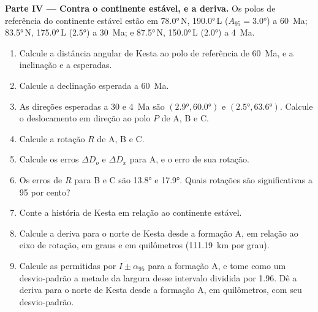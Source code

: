 \begin{problem}
\medskip\noindent\textbf{Parte IV --- Contra o continente estável, e a deriva.} Os
polos de referência do continente estável estão em \ang{78.0}\,N, \ang{190.0}\,L
($A_{95} = \ang{3.0}$) a \qty{60}{Ma}; \ang{83.5}\,N, \ang{175.0}\,L
($\ang{2.5}$) a \qty{30}{Ma}; e \ang{87.5}\,N, \ang{150.0}\,L ($\ang{2.0}$)
a \qty{4}{Ma}.
\begin{enumerate}[resume]
  \item Calcule a distância angular de Kesta ao polo de referência de \qty{60}{Ma},
        e a inclinação e a  esperadas.
  \item Calcule a declinação esperada a \qty{60}{Ma}.
  \item As direções esperadas a 30 e \qty{4}{Ma} são $(\ang{2.9},
        \ang{60.0})$ e $(\ang{2.5}, \ang{63.6})$. Calcule o deslocamento
        em direção ao polo $P$ de A, B e C.
  \item Calcule a rotação $R$ de A, B e C.
  \item Calcule os erros $\Delta D_o$ e $\Delta D_x$ para A, e o erro de sua
        rotação.
  \item Os erros de $R$ para B e C são \ang{13.8} e \ang{17.9}. Quais rotações são
        significativas a 95 por cento?
  \item Conte a história de Kesta em relação ao continente estável.
  \item Calcule a deriva para o norte de Kesta desde a formação A, em relação ao
        eixo de rotação, em graus e em quilômetros
        (\qty{111.19}{km} por grau).
  \item Calcule as  permitidas por $I \pm \alpha_{95}$ para a formação A,
        e tome como um desvio-padrão a metade da largura desse intervalo dividida
        por 1.96. Dê a deriva para o norte de Kesta desde a formação A, em
        quilômetros, com seu desvio-padrão.
\end{enumerate}
\end{problem}

